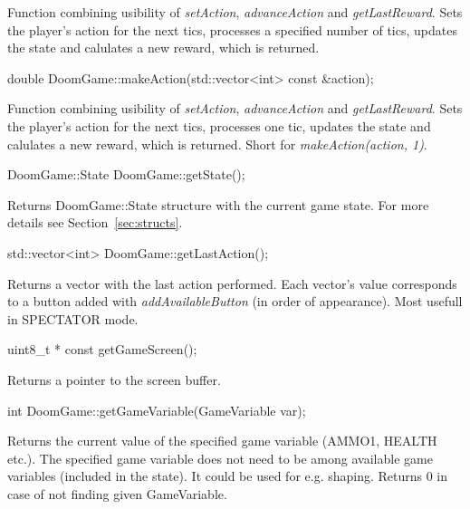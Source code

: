 	Function combining usibility of \emph{setAction}, \emph{advanceAction} and \emph{getLastReward}. Sets the player's action for the next tics, processes a specified number of tics, updates the state and calulates a new reward, which is returned.

\vspace{20pt}   
\begin{clinee}
	double DoomGame::makeAction(std::vector<int> const &action);
\end{clinee}

	Function combining usibility of \emph{setAction}, \emph{advanceAction} and \emph{getLastReward}. Sets the player's action for the next tics, processes one tic, updates the state and calulates a new reward, which is returned. Short for \emph{makeAction(action, 1)}.


\vspace{20pt}
\begin{clinee}
	DoomGame::State DoomGame::getState();
\end{clinee}

	Returns DoomGame::State structure with the current game state. For more details see Section~\ref{sec:structs}.


\vspace{20pt}
\begin{clinee}
	std::vector<int> DoomGame::getLastAction();
\end{clinee}

	Returns a vector with the last action performed. Each vector's value corresponds to a button added with \emph{addAvailableButton} (in order of appearance). Most usefull in SPECTATOR mode.


\vspace{20pt}
\begin{clinee}
	uint8_t * const getGameScreen();
\end{clinee}

	Returns a pointer to the screen buffer.


\vspace{20pt}
\begin{clinee}
	int DoomGame::getGameVariable(GameVariable var);
\end{clinee}

	Returns the current value of the specified game variable (AMMO1, HEALTH etc.). The specified game variable does not need to be among available game variables (included in the state).
	It could be used for e.g. shaping. Returns 0 in case of not finding given GameVariable.


